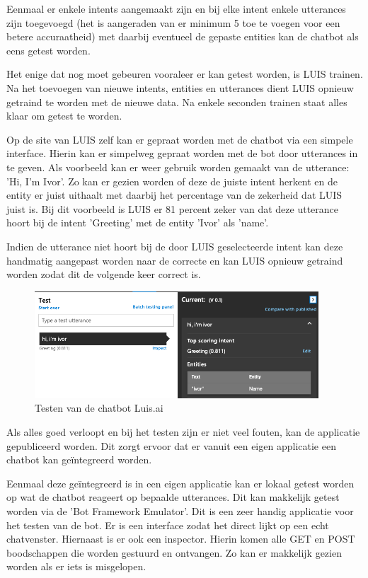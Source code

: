 Eenmaal er enkele intents aangemaakt zijn en bij elke intent enkele utterances zijn toegevoegd (het is aangeraden van er minimum 5 toe te voegen voor een betere accuraatheid) met daarbij eventueel de gepaste entities kan de chatbot als eens getest worden.

Het enige dat nog moet gebeuren vooraleer er kan getest worden, is LUIS trainen. Na het toevoegen van nieuwe intents, entities en utterances dient LUIS opnieuw getraind te worden met de nieuwe data. Na enkele seconden trainen staat alles klaar om getest te worden.

Op de site van LUIS zelf kan er gepraat worden met de chatbot via een simpele interface. Hierin kan er simpelweg gepraat worden met de bot door utterances in te geven. Als voorbeeld kan er weer gebruik worden gemaakt van de utterance: 'Hi, I'm Ivor'. Zo kan er gezien worden of deze de juiste intent herkent en de entity er juist uithaalt met daarbij het percentage van de zekerheid dat LUIS juist is. Bij dit voorbeeld is LUIS er 81 percent zeker van dat deze utterance hoort bij de intent 'Greeting' met de entity 'Ivor' als 'name'.

Indien de utterance niet hoort bij de door LUIS geselecteerde intent kan deze handmatig aangepast worden naar de correcte en kan LUIS opnieuw getraind worden zodat dit de volgende keer correct is.

\begin{figure}[h!]
	\centering
	\includegraphics[height=4cm]{img/test.png}
	\caption{Testen van de chatbot Luis.ai}
	\label{fig:test}
\end{figure}

Als alles goed verloopt en bij het testen zijn er niet veel fouten, kan de applicatie gepubliceerd worden. Dit zorgt ervoor dat er vanuit een eigen applicatie een chatbot kan geïntegreerd worden.

Eenmaal deze geïntegreerd is in een eigen applicatie kan er lokaal getest worden op wat de chatbot reageert op bepaalde utterances. Dit kan makkelijk getest worden via de 'Bot Framework Emulator'. Dit is een zeer handig applicatie voor het testen van de bot. Er is een interface zodat het direct lijkt op een echt chatvenster. Hiernaast is er ook een inspector. Hierin komen alle GET en POST boodschappen die worden gestuurd en ontvangen. Zo kan er makkelijk gezien worden als er iets is misgelopen.

